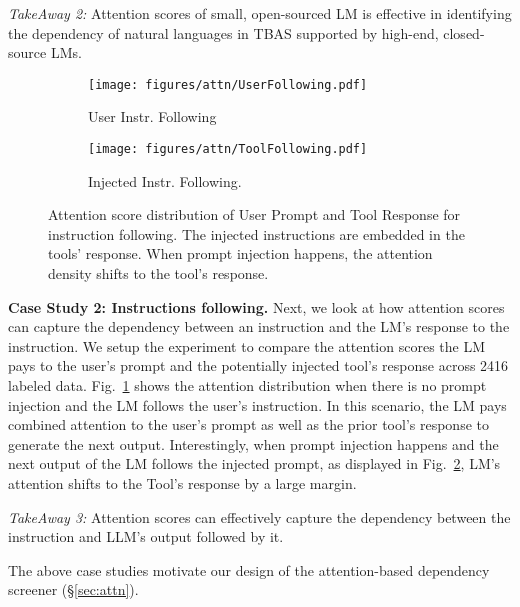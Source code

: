 \textit{TakeAway 2:} Attention scores of small, open-sourced LM is effective in identifying the dependency of natural languages in TBAS supported by high-end, closed-source LMs.  

\begin{figure}[t]
    \centering
    \begin{subfigure}[b]{0.22\textwidth}
         \centering
         \texttt{[image: figures/attn/UserFollowing.pdf]}
         \caption{User Instr. Following}
         \label{fig:user-follow}
     \end{subfigure}
     \hfill
    \begin{subfigure}[b]{0.22\textwidth}
         \centering
         \texttt{[image: figures/attn/ToolFollowing.pdf]}
         \caption{Injected Instr. Following.}
         \label{fig:inj-follow}
     \end{subfigure}
    \caption{Attention score distribution of User Prompt and Tool Response for instruction following. The injected instructions are embedded in the tools' response. When prompt injection happens, the attention density shifts to the tool's response.}
    \label{fig:enter-label}
\end{figure}

\textbf{Case Study 2: Instructions following.} Next, we look at how attention scores can capture the dependency between an instruction and the LM's response to the instruction. We setup the experiment to compare the attention scores the LM pays to the user's prompt and the potentially injected tool's response across 2416 labeled data. Fig.~\ref{fig:user-follow} shows the attention distribution when there is no prompt injection and the LM follows the user's instruction. In this scenario, the LM pays combined attention to the user's prompt as well as the prior tool's response to generate the next output. 
Interestingly, when prompt injection happens and the next output of the LM follows the injected prompt, as displayed in Fig.~\ref{fig:inj-follow}, LM's attention shifts to the Tool's response by a large margin. 

\textit{TakeAway 3:} Attention scores can effectively capture the dependency between the instruction and LLM's output followed by it. 

The above case studies motivate our design of the attention-based dependency screener (\S\ref{sec:attn}). 



